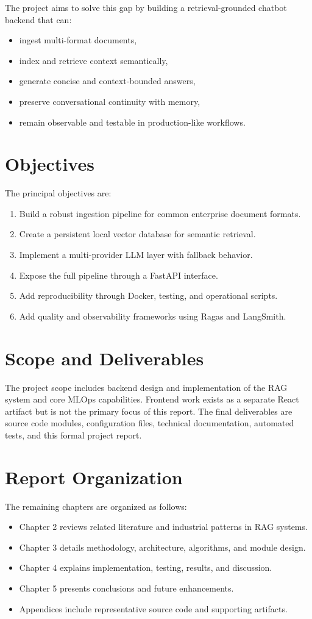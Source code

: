 \documentclass[12pt,letterpaper]{report}
\begin{document}
The project aims to solve this gap by building a retrieval-grounded chatbot backend that can:
\begin{itemize}
\item ingest multi-format documents,
\item index and retrieve context semantically,
\item generate concise and context-bounded answers,
\item preserve conversational continuity with memory,
\item remain observable and testable in production-like workflows.
\end{itemize}

\section{Objectives}
The principal objectives are:
\begin{enumerate}
\item Build a robust ingestion pipeline for common enterprise document formats.
\item Create a persistent local vector database for semantic retrieval.
\item Implement a multi-provider LLM layer with fallback behavior.
\item Expose the full pipeline through a FastAPI interface.
\item Add reproducibility through Docker, testing, and operational scripts.
\item Add quality and observability frameworks using Ragas and LangSmith.
\end{enumerate}

\section{Scope and Deliverables}
The project scope includes backend design and implementation of the RAG system and core MLOps capabilities. Frontend work exists as a separate React artifact but is not the primary focus of this report. The final deliverables are source code modules, configuration files, technical documentation, automated tests, and this formal project report.

\section{Report Organization}
The remaining chapters are organized as follows:
\begin{itemize}
\item Chapter 2 reviews related literature and industrial patterns in RAG systems.
\item Chapter 3 details methodology, architecture, algorithms, and module design.
\item Chapter 4 explains implementation, testing, results, and discussion.
\item Chapter 5 presents conclusions and future enhancements.
\item Appendices include representative source code and supporting artifacts.
\end{itemize}
\end{document}
